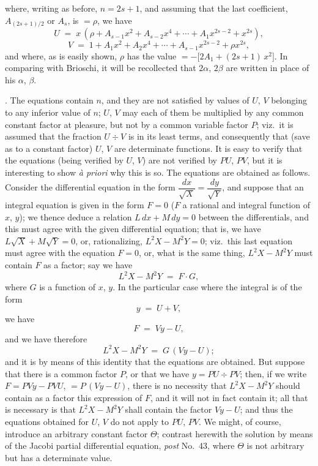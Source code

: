 \documentclass[11pt]{article}
\begin{document}
\newpage

\noindent where, writing as before, $n = 2s + 1$, and assuming that the last coefficient, $A_{(2s+1)/2}$ or $A_s$, is $= \rho$, we have
\[
U \;=\; x\,(\rho + A_{s-1}x^2 + A_{s-2}x^4 + \cdots + A_1 x^{2s-2} + x^{2s}),
\]
\[
V \;=\; 1 + A_1 x^2 + A_2 x^4 + \cdots + A_{s-1}x^{2s-2} + \rho x^{2s},
\]
and where, as is easily shown, $\rho$ has the value $=-\bigl[2 A_1 + (2s + 1)\,x^2\bigr]$. In comparing with Brioschi, it will be recollected that $2\alpha$, $2\beta$ are written in place of his $\alpha$, $\beta$.

\medskip

. The equations contain $n$, and they are not satisfied by values of $U$, $V$ belonging to any inferior value of $n$; $U$, $V$ may each of them be multiplied by any common constant factor at pleasure, but not by a common variable factor $P$; viz.\ it is assumed that the fraction $U \div V$ is in its least terms, and consequently that (save as to a constant factor) $U$, $V$ are determinate functions. It is easy to verify that the equations (being verified by $U$, $V$) are not verified by $PU$, $PV$, but it is interesting to show \textit{\`a priori} why this is so. The equations are obtained as follows. Consider the differential equation in the form $\dfrac{dx}{\sqrt{X}} = \dfrac{dy}{\sqrt{Y}}$, and suppose that an integral equation is given in the form $F = 0$ ($F$ a rational and integral function of $x$, $y$); we thence deduce a relation $L\,dx + M\,dy = 0$ between the differentials, and this must agree with the given differential equation; that is, we have $L\sqrt{X} + M\sqrt{Y} = 0$, or, rationalizing, $L^2 X - M^2 Y = 0$; viz.\ this last equation must agree with the equation $F = 0$, or, what is the same thing, $L^2 X - M^2 Y$ must contain $F$ as a factor; say we have
\[
L^2 X - M^2 Y \;=\; F\cdot G,
\]
where $G$ is a function of $x$, $y$. In the particular case where the integral is of the form
\[
y \;=\; U + V,
\]
we have
\[
F \;=\; V y - U,
\]
and we have therefore
\[
L^2 X - M^2 Y \;=\; G\,(V y - U);
\]
and it is by means of this identity that the equations are obtained. But suppose that there is a common factor $P$, or that we have $y = PU \div PV$; then, if we write $F = P V y - P V U$, $= P\,(V y - U)$, there is no necessity that $L^2 X - M^2 Y$ should contain as a factor this expression of $F$, and it will not in fact contain it; all that is necessary is that $L^2 X - M^2 Y$ shall contain the factor $V y - U$; and thus the equations obtained for $U$, $V$ do not apply to $PU$, $PV$. We might, of course, introduce an arbitrary constant factor $\Theta$; contrast herewith the solution by means of the Jacobi partial differential equation, \textit{post} No.~43, where $\Theta$ is not arbitrary but has a determinate value.
\end{document}
